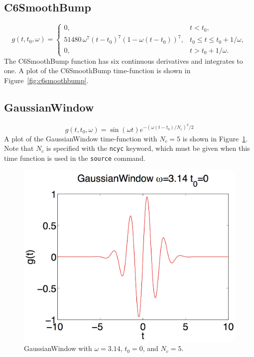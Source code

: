 \documentclass[11pt]{report}
\begin{document}
\subsection{C6SmoothBump} 
\[
g(t,t_0,\omega) = \left\{ 
\begin{array}{ll} 
0, & t < t_0,\\ 
51480\, \omega^7 (t-t_0)^7 (1- \omega(t-t_0))^7, & t_0 \leq t \leq t_0 + 1/\omega,\\ 
0, & t > t_0 + 1/\omega.
\end{array}
\right.
\]
The C6SmoothBump function has six continuous derivatives and integrates to one.
A plot of the C6SmoothBump time-function is shown in Figure~\ref{fig:c6smoothbump}.
%
\subsection{GaussianWindow}
\[
g(t,t_0,\omega) = \sin(\omega t) e^{-(\omega(t-t_0)/N_c)^2/2}
\]
A plot of the GaussianWindow time-function with $N_c=5$ is shown in
Figure~\ref{fig:gaussianwindow}. Note that $N_c$ is specified with the \verb+ncyc+ keyword, which
must be given when this time function is used in the \verb+source+ command.
\begin{figure}
\begin{centering}
  \includegraphics[width=0.6\linewidth]{GW.png}
  \caption{GaussianWindow with $\omega=3.14$, $t_0=0$, and $N_c=5$.}
  \label{fig:gaussianwindow}
\end{centering}
\end{figure}  
\end{document}
